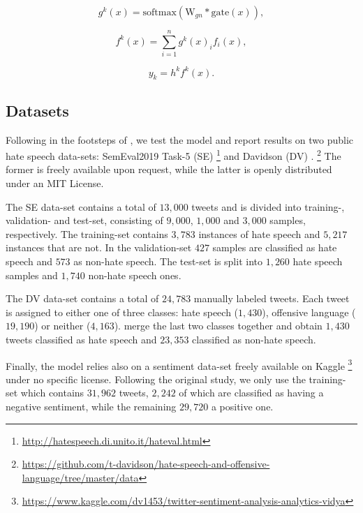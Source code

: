     \begin{equation}
        g^k(x) = \mathrm{softmax}(\mathrm{W}_{gn} * \mathrm{gate}(x)),
    \end{equation}
    
    \begin{equation}
        f^k(x) = \sum_{i=1}^{n} g^k(x)_i f_i(x),
    \end{equation}
    
    \begin{equation}
        y_k = h^k f^k(x).
    \end{equation}


\subsection{Datasets}
Following in the footsteps of \citeauthor{original:zhou} \cite{original:zhou}, we test the model and report results on two public hate speech data-sets:
SemEval2019 Task-5 (SE) \cite{basile:semeval}%
\footnote{\url{http://hatespeech.di.unito.it/hateval.html}}
and Davidson (DV) \cite{davidson2017}.%
\footnote{\url{https://github.com/t-davidson/hate-speech-and-offensive-language/tree/master/data}} The former is freely available upon request, while the latter is openly distributed under an MIT License.

The SE data-set contains a total of $13,000$ tweets and is divided into training-, validation- and test-set, consisting of $9,000$, $1,000$ and $3,000$ samples, respectively. The training-set contains $3,783$ instances of hate speech and $5,217$ instances that are not. In the validation-set $427$ samples are classified as hate speech and $573$ as non-hate speech. The test-set is split into $1,260$ hate speech samples and $1,740$ non-hate speech ones.

The DV data-set contains a total of $24,783$ manually labeled tweets. Each tweet is assigned to either one of three classes: hate speech ($1,430$), offensive language ($19,190$) or neither ($4,163$). \citeauthor{original:zhou} merge the last two classes together and obtain $1,430$ tweets classified as hate speech and $23,353$ classified as non-hate speech.

Finally, the model relies also on a sentiment data-set freely available on Kaggle%
\footnote{\url{https://www.kaggle.com/dv1453/twitter-sentiment-analysis-analytics-vidya}} under no specific license. Following the original study,
we only use the training-set which contains $31,962$ tweets, $2,242$ of which are classified as having a negative sentiment, while the remaining $29,720$ a positive one.


